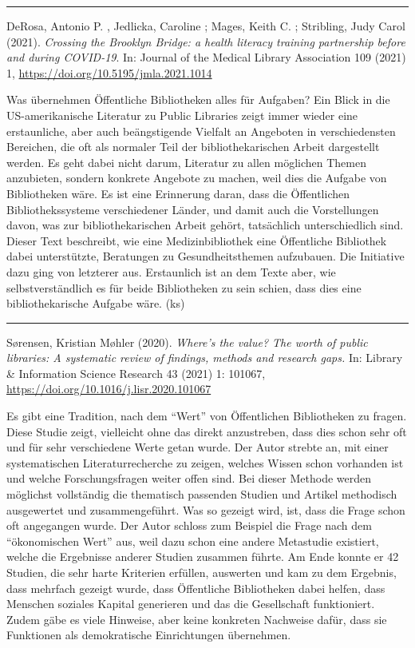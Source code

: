 \documentclass[a4paper,
fontsize=11pt,
oneside,
numbers=noperiodatend,
parskip=half-,
bibliography=totoc,
final
]{scrartcl}
\begin{document}
\begin{center}\rule{0.5\linewidth}{0.5pt}\end{center}

DeRosa, Antonio P. , Jedlicka, Caroline ; Mages, Keith C. ; Stribling,
Judy Carol (2021). \emph{Crossing the Brooklyn Bridge: a health literacy
training partnership before and during COVID-19}. In: Journal of the
Medical Library Association 109 (2021) 1,
\url{https://doi.org/10.5195/jmla.2021.1014}

Was übernehmen Öffentliche Bibliotheken alles für Aufgaben? Ein Blick in
die US-amerikanische Literatur zu Public Libraries zeigt immer wieder
eine erstaunliche, aber auch beängstigende Vielfalt an Angeboten in
verschiedensten Bereichen, die oft als normaler Teil der
bibliothekarischen Arbeit dargestellt werden. Es geht dabei nicht darum,
Literatur zu allen möglichen Themen anzubieten, sondern konkrete
Angebote zu machen, weil dies die Aufgabe von Bibliotheken wäre. Es ist
eine Erinnerung daran, dass die Öffentlichen Bibliothekssysteme
verschiedener Länder, und damit auch die Vorstellungen davon, was zur
bibliothekarischen Arbeit gehört, tatsächlich unterschiedlich sind.
Dieser Text beschreibt, wie eine Medizinbibliothek eine Öffentliche
Bibliothek dabei unterstützte, Beratungen zu Gesundheitsthemen
aufzubauen. Die Initiative dazu ging von letzterer aus. Erstaunlich ist
an dem Texte aber, wie selbstverständlich es für beide Bibliotheken zu
sein schien, dass dies eine bibliothekarische Aufgabe wäre. (ks)

\begin{center}\rule{0.5\linewidth}{0.5pt}\end{center}

Sørensen, Kristian Møhler (2020). \emph{Where's the value? The worth of
public libraries: A systematic review of findings, methods and research
gaps.} In: Library \& Information Science Research 43 (2021) 1: 101067,
\url{https://doi.org/10.1016/j.lisr.2020.101067}

Es gibt eine Tradition, nach dem \enquote{Wert} von Öffentlichen
Bibliotheken zu fragen. Diese Studie zeigt, vielleicht ohne das direkt
anzustreben, dass dies schon sehr oft und für sehr verschiedene Werte
getan wurde. Der Autor strebte an, mit einer systematischen
Literaturrecherche zu zeigen, welches Wissen schon vorhanden ist und
welche Forschungsfragen weiter offen sind. Bei dieser Methode werden
möglichst vollständig die thematisch passenden Studien und Artikel
methodisch ausgewertet und zusammengeführt. Was so gezeigt wird, ist,
dass die Frage schon oft angegangen wurde. Der Autor schloss zum
Beispiel die Frage nach dem \enquote{ökonomischen Wert} aus, weil dazu
schon eine andere Metastudie existiert, welche die Ergebnisse anderer
Studien zusammen führte. Am Ende konnte er 42 Studien, die sehr harte
Kriterien erfüllen, auswerten und kam zu dem Ergebnis, dass mehrfach
gezeigt wurde, dass Öffentliche Bibliotheken dabei helfen, dass Menschen
soziales Kapital generieren und das die Gesellschaft funktioniert. Zudem
gäbe es viele Hinweise, aber keine konkreten Nachweise dafür, dass sie
Funktionen als demokratische Einrichtungen übernehmen.
\end{document}
